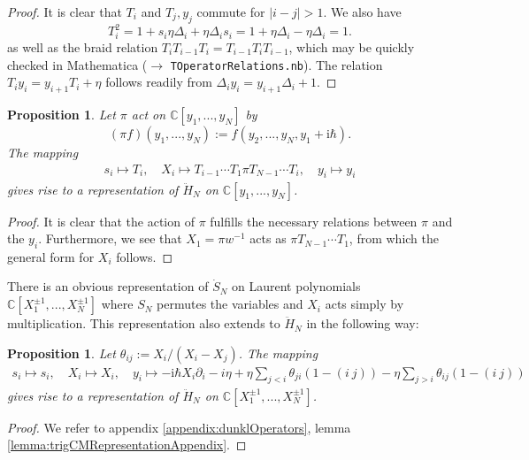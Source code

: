 \documentclass[11pt]{report}
\newtheorem{prop}[theorem]{Proposition}
\theoremstyle{definition}
\theoremstyle{remark}
\theoremstyle{remark}
\newcommand{\C}{\mathbb{C}}
\newcommand{\I}{\mathrm{i}}
\begin{document}
\begin{proof}
It is clear that $T_i$ and $T_j,y_j$ commute for $|i-j|>1$. We also have
\begin{equation*}
T_i^2 = 1 + s_i \eta \Delta_i + \eta \Delta_i s_i = 1 + \eta \Delta_i - \eta \Delta_i = 1.
\end{equation*}
as well as the braid relation $T_i T_{i-1} T_i = T_{i-1} T_i T_{i-1}$, which may be quickly checked in Mathematica ($\to$ \texttt{TOperatorRelations.nb}). The relation $T_i y_i = y_{i+1} T_i + \eta$ follows readily from $\Delta_i y_i = y_{i+1} \Delta_i + 1$.
\end{proof}

\begin{prop}
Let $\pi$ act on $\C[y_1,...,y_N]$ by
\begin{equation*}
(\pi f)(y_1,...,y_N) := f(y_2,...,y_N,y_1 + \I \hbar).
\end{equation*}
The mapping
\begin{align*}
s_i \mapsto T_i, \quad X_i \mapsto T_{i-1} \cdots T_1 \pi T_{N-1} \cdots T_i, \quad y_i \mapsto y_i
\end{align*}
gives rise to a representation of $\ddot H_N$ on $\C[y_1,...,y_N]$.
\end{prop}

\begin{proof}
It is clear that the action of $\pi$ fulfills the necessary relations between $\pi$ and the $y_i$. Furthermore, we see that $X_1 = \pi w^{-1}$ acts as $\pi T_{N-1} \cdots T_1$, from which the general form for $X_i$ follows.
\end{proof}

There is an obvious representation of $\dot S_N$ on Laurent polynomials $\C[X_1^{\pm 1},...,X_N^{\pm 1}]$ where $S_N$ permutes the variables and $X_i$ acts simply by multiplication. This representation also extends to $\ddot H_N$ in the following way:

\begin{prop}\label{prop:trigCMRepresentation}
Let $\theta_{ij} := X_i/(X_i-X_j)$. The mapping
\begin{align*}
s_i \mapsto s_i, \quad X_i \mapsto X_i, \quad y_i \mapsto -\I \hbar X_i \partial_i - i \eta + \eta \sum_{j < i} \theta_{ji} (1-(i \ j)) - \eta \sum_{j > i} \theta_{ij} (1-(i \ j))
\end{align*}
gives rise to a representation of $\ddot H_N$ on $\C[X_1^{\pm 1},...,X_N^{\pm 1}]$.
\end{prop}

\begin{proof}
We refer to appendix \ref{appendix:dunklOperators}, lemma \ref{lemma:trigCMRepresentationAppendix}.
\end{proof}
\end{document}
